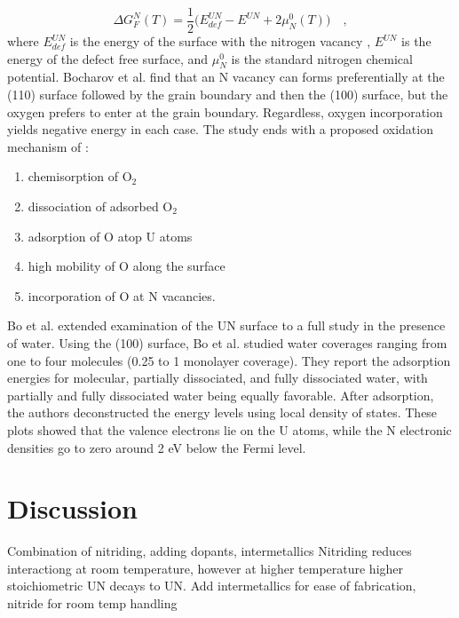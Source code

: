 \documentclass[3p,review,11pt]{elsarticle}
\begin{document}
\begin{equation}
\Delta G^{N}_{F}(T) = \frac{1}{2} \bigg(E^{UN}_{def}-E^{UN}+2\mu _{N}^{0}(T)\bigg) \quad ,
\end{equation} 
where $E^{UN}_{def}$ is the energy of the surface with the nitrogen vacancy , $E^{UN}$ is the energy of the defect free surface, and $\mu _{N}^{0}$ is the standard nitrogen chemical potential. Bocharov et al. find that an N vacancy can forms preferentially at the (110) surface followed by the grain boundary and then the (100) surface, but the oxygen prefers to enter at the grain boundary. Regardless, oxygen incorporation yields negative energy in each case. The study ends with a proposed oxidation mechanism of \cite{Bocharov2013}: 
\begin{enumerate}
	\item chemisorption of O$_{2}$
	\item dissociation of adsorbed O$_{2}$
	\item adsorption of O atop U atoms
	\item high mobility of O along the surface
	\item incorporation of O at N vacancies.
\end{enumerate}
\par 
Bo et al. \cite{Bo2016} extended examination of the UN surface to a full study in the presence of water. Using the (100) surface, Bo et al. studied water coverages ranging from one to four molecules (0.25 to 1 monolayer coverage). They report the adsorption energies for molecular, partially dissociated, and fully dissociated water, with partially and fully dissociated water being equally favorable. After adsorption, the authors deconstructed the energy levels using local density of states. These plots showed that the valence electrons lie on the U atoms, while the N electronic densities go to zero around 2 eV below the Fermi level.

\section{Discussion}

Combination of nitriding, adding dopants, intermetallics
Nitriding reduces interactiong at room temperature, however at higher temperature higher stoichiometric UN decays to UN.
Add intermetallics for ease of fabrication, nitride for room temp handling
\par 
\end{document}
